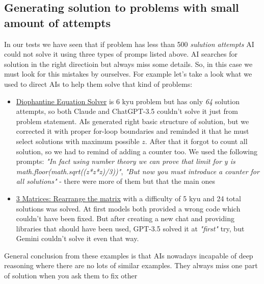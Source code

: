 \documentclass[12pt]{report}
\begin{document}
	\subsection{Generating solution to problems with small amount of attempts}
		\qquad In our tests we have seen that if problem has less than 500 \textit{sulution attempts} AI could not solve it using three types of promps listed above. AI searches for solution in the right directioin but always miss some details. So, in this case we must look for this mistakes by ourselves. For example let's take a look what we used to direct AIs to help them solve that kind of problems:
		
		\begin{itemize}
			\item\href{https://www.codewars.com/kata/57e32bb7ec7d241045000661}{Diophantine Equation Solver} is 6 kyu problem but has only \textit{64} solution attempts, so both Claude and ChatGPT-3.5 couldn't solve it just from problem statement. AIs generated right basic structure of solution, but we corrected it with proper for-loop boundaries and reminded it that he must select solutions with maximum possible $z$. After that it forgot to count all solution, so we had to remind of adding a counter too. We used the following prompts: \textit{"In fact using number theory we can prove that limit for y is math.floor(math.sqrt((z*z*z)/3))"}, \textit{"But now you must introduce a counter for all solutions"} - there were more of them but that the main ones
			\item\href{https://www.codewars.com/kata/5901aee0af945e3a35000068/train/python}{3 Matrices: Rearrange the matrix} with a difficulty of 5 kyu and 24 total solutions was solved. At first models both provided a wrong code which couldn't have been fixed. But after creating a new chat and providing libraries that should have been used, GPT-3.5 solved it at \textit{"first"} try, but Gemini couldn't solve it even that way. 
			
		\end{itemize}
		
		
		General conclusion from these examples is that AIs nowadays incapable of deep reasoning where there are no lots of similar examples. They always miss one part of solution when you ask them to fix other
	
\end{document}
